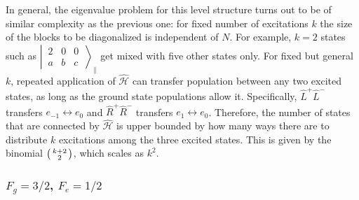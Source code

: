 \documentclass[aps,prx,superscriptaddress,twocolumn,notitlepage,nofootinbib,longbibliography]{revtex4-2}
\begin{document}
In general, the eigenvalue problem for this level structure turns out to be of similar complexity as the previous one: for fixed number of excitations $k$ the size of the blocks to be diagonalized is independent of $N$. For example, $k=2$ states such as $\left|\, \begin{smallmatrix} 2 & 0 & 0 \\  a & b & c  \end{smallmatrix} \,\right\rangle_\parallel$ get mixed with five other states only. For fixed but general $k$, repeated application of $\hat{\mathcal{H}}$ can transfer population between any two excited states, as long as the ground state populations allow it. Specifically, $\hat{L}^+\hat{L}^-$ transfers $e_{-1}\leftrightarrow e_0$ and $\hat{R}^+\hat{R}^-$ transfers $e_{1}\leftrightarrow e_0$.
Therefore, the number of states that are connected by $\hat{\mathcal{H}}$ is upper bounded by how many ways there are to distribute $k$ excitations among the three excited states. This is given by the  binomial $\begin{psmallmatrix} k+2 \\ 2 \end{psmallmatrix}$, which scales as $k^2$.






\subsubsection{\texorpdfstring{$F_g=3/2$, $F_e=1/2$}{Fg=3/2, Fe=1/2}}
\end{document}
